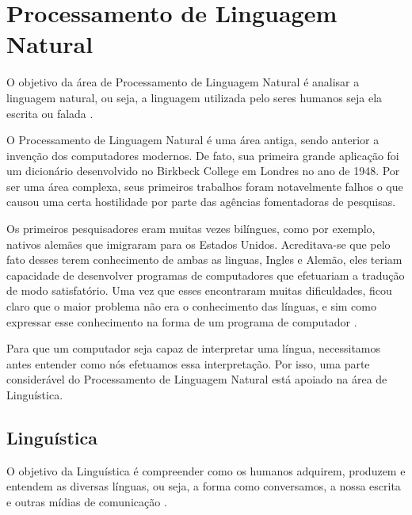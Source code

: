 \chapter{Processamento de Linguagem Natural}
\label{cap:Processamento}


O objetivo da área de Processamento de Linguagem Natural é analisar a linguagem
natural, ou seja, a linguagem utilizada pelo seres humanos seja ela escrita
ou falada \cite{manningschutze1999}.

O Processamento de Linguagem Natural é uma área antiga, sendo anterior a
invenção dos computadores modernos. De fato, sua primeira grande aplicação foi
um dicionário desenvolvido no Birkbeck College em Londres no ano de 1948. Por ser
uma área complexa, seus primeiros trabalhos foram notavelmente falhos o que
causou uma certa hostilidade por parte das agências fomentadoras de pesquisas.

Os primeiros pesquisadores eram muitas vezes bilíngues, como por exemplo,
nativos alemães que imigraram para os Estados Unidos. Acreditava-se que pelo
fato desses terem conhecimento de ambas as linguas, Ingles e Alemão, eles teriam
capacidade de desenvolver programas de computadores que efetuariam a tradução 
de modo satisfatório. Uma vez que esses encontraram muitas dificuldades,
ficou claro que o maior problema não era o conhecimento das
línguas, e sim como expressar esse conhecimento na forma de um programa de
computador \cite{history}.

Para que um computador seja capaz de interpretar uma
língua, necessitamos antes entender como nós efetuamos essa
interpretação.
Por isso, uma parte considerável do Processamento de Linguagem Natural está apoiado na área de Linguística.

\section{Linguística}

O objetivo da Linguística é compreender como os humanos adquirem, produzem e
entendem as diversas línguas, ou seja, a forma como conversamos, a nossa
escrita e outras mídias de comunicação \cite{manningschutze1999}.

